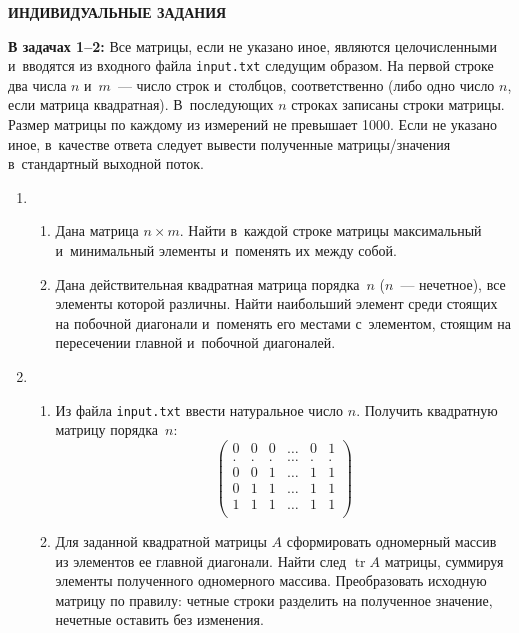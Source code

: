 \documentclass{article}
\begin{document}
\newpage

\bigskip\sloppy

\noindent\centerline{\textbf{ИНДИВИДУАЛЬНЫЕ ЗАДАНИЯ}}

\medskip

{\color{red}\textbf{В задачах 1--2:}} Все матрицы, если не указано иное, являются целочисленными и~вводятся из входного файла \texttt{input.txt} следущим образом. На первой строке два числа $n$ и~$m$~— число строк и~столбцов, соответственно (либо одно число $n$, если матрица квадратная). В~последующих $n$ строках записаны строки матрицы. Размер матрицы по каждому из измерений не превышает 1000. Если не указано иное, в~качестве ответа следует вывести полученные матрицы/значения в~стандартный выходной поток.


\begin{enumerate}[label={}, leftmargin=0pt, itemindent=0pt]
\item
\begin{enumerate}[label=\arabic{enumi}.\arabic*.] %
  \item
  Дана матрица $n\times m$. Найти в~каждой строке матрицы максимальный и~минимальный элементы и~поменять их между собой. 
  \item
  Дана действительная квадратная матрица порядка~$n$ ($n$~— нечетное), все элементы которой различны. Найти наибольший элемент среди стоящих на побочной диагонали и~поменять его местами с~элементом, стоящим на пересечении главной и~побочной диагоналей.
\end{enumerate}

\item
\begin{enumerate}[label=\arabic{enumi}.\arabic*.] %
  \item
  Из файла \texttt{input.txt} ввести натуральное число $n$. Получить квадратную матрицу порядка~$n$:
  \[
  \left(
  \begin{array}{cccccc}
  0 & 0 & 0 & \ldots & 0 & 1\\
  . & . & . & \ldots & . & .\\
  0 & 0 & 1 & \ldots & 1 & 1\\
  0 & 1 & 1 & \ldots & 1 & 1\\
  1 & 1 & 1 & \ldots & 1 & 1\\
  \end{array}
  \right)
  \]
  \item
  Для заданной квадратной матрицы $A$ сформировать одномерный массив из элементов ее главной диагонали. Найти след $ \mathop{\mathrm{tr}} A$ матрицы, суммируя элементы полученного одномерного массива. Преобразовать исходную матрицу по правилу: четные строки разделить на полученное значение, нечетные оставить без изменения.
\end{enumerate}


\end{enumerate}
\end{document}
